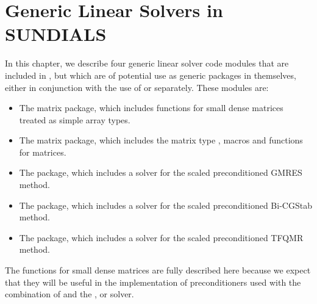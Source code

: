 \chapter{Generic Linear Solvers in SUNDIALS}\label{s:gen_linsolv}
In this chapter, we describe four generic linear solver code modules that 
are included in {\sundials}, but which are of potential use as generic packages in
themselves, either in conjunction with the use of {\kinsol} or separately.
These modules are:
\begin{itemize}
\item The {\dense} matrix package, which includes functions
      for small dense matrices treated as simple array types.
\item The {\band} matrix package, which includes the matrix type ,
      macros and functions for  matrices.
\item The {\spgmr} package, which includes a solver for the scaled
      preconditioned GMRES method.
\item The {\spbcg} package, which includes a solver for the scaled
      preconditioned Bi-CGStab method.
\item The {\sptfqmr} package, which includes a solver for the scaled
      preconditioned TFQMR method.
\end{itemize}

The functions for small dense matrices are fully
described here because we expect that they will be useful in the
implementation of preconditioners used with the combination of {\kinsol}
and the {\kinspgmr}, {\kinspbcg} or {\kinsptfqmr} solver.








